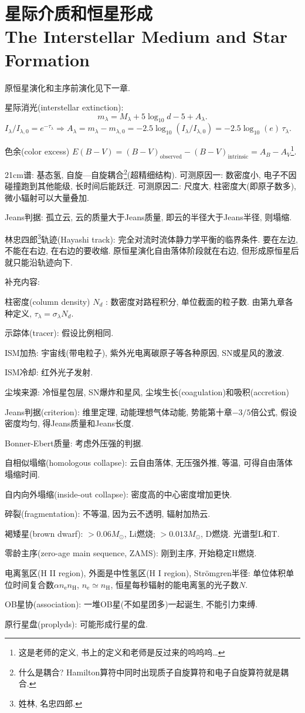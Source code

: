 \chapter{星际介质和恒星形成\\The Interstellar Medium and Star Formation}

原恒星演化和主序前演化见下一章.

星际消光(interstellar extinction):
\begin{equation*}
    m_\lambda=M_\lambda+5\log_{10}d-5+A_\lambda.
\end{equation*}
$I_\lambda/I_{\lambda,0}=e^{-\tau_\lambda}\Rightarrow A_\lambda=m_\lambda-m_{\lambda,0}=-2.5\log_{10}(I_\lambda/I_{\lambda,0})=-2.5\log_{10}(e)\,\tau_\lambda$.

色余(color excess) $E(B-V)=(B-V)_\text{observed}-(B-V)_\text{intrinsic}=A_B-A_V$\footnote{这是老师的定义, 书上的定义和老师是反过来的呜呜呜\dots}.

21cm谱: 基态氢, 自旋---自旋耦合\footnote{什么是耦合? Hamilton算符中同时出现质子自旋算符和电子自旋算符就是耦合.}(超精细结构). 可测原因一: 数密度小, 电子不因碰撞跑到其他能级, 长时间后能跃迁. 可测原因二: 尺度大, 柱密度大(即原子数多), 微小辐射可以大量叠加.

Jeans判据: 孤立云, 云的质量大于Jeans质量, 即云的半径大于Jeans半径, 则塌缩.

林忠四郎\footnote{姓林, 名忠四郎.}轨迹(Hayashi track): 完全对流时流体静力学平衡的临界条件. 要在左边, 不能在右边, 在右边的要收缩. 原恒星演化自由落体阶段就在右边, 但形成原恒星后就只能沿轨迹向下.

补充内容:

柱密度(column density) $N_{d}$ : 数密度对路程积分, 单位截面的粒子数. 由第九章各种定义, $\tau_\lambda=\sigma_\lambda N_{d}$.

示踪体(tracer): 假设比例相同.

ISM加热: 宇宙线(带电粒子), 紫外光电离碳原子等各种原因, SN或星风的激波.

ISM冷却: 红外光子发射.

尘埃来源: 冷恒星包层, SN爆炸和星风, 尘埃生长(coagulation)和吸积(accretion)

Jeans判据(criterion): 维里定理, 动能理想气体动能, 势能第十章$-3/5$倍公式, 假设密度均匀, 得Jeans质量和Jeans长度.

Bonner-Ebert质量: 考虑外压强的判据.

自相似塌缩(homologous collapse): 云自由落体, 无压强外推, 等温, 可得自由落体塌缩时间.

自内向外塌缩(inside-out collapse): 密度高的中心密度增加更快.

碎裂(fragmentation): 不等温, 因为云不透明, 辐射加热云.

褐矮星(brown dwarf): $>0.06M_\odot$, Li燃烧; $>0.013M_\odot$, D燃烧. 光谱型L和T.

零龄主序(zero-age main sequence, ZAMS): 刚到主序, 开始稳定H燃烧.

电离氢区(H II region), 外面是中性氢区(H I region), Str\"omgren半径: 单位体积单位时间复合数$\alpha n_\text{e}n_\text{H}$, $n_\text{e}\simeq n_\text{H}$, 恒星每秒辐射的能电离氢的光子数$N$.

OB星协(association): 一堆OB星(不如星团多)一起诞生, 不能引力束缚.

原行星盘(proplyds): 可能形成行星的盘.
